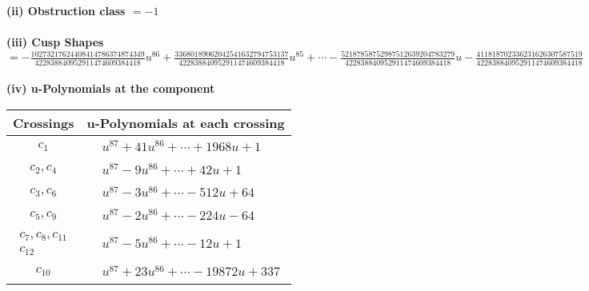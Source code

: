 \documentclass[1p]{elsarticle_modified}
\theoremstyle{definition}
\begin{document}
\flushleft \textbf{(ii) Obstruction class $= -1$}\\~\\
\flushleft \textbf{(iii) Cusp Shapes $= -\frac{10273217624408414786374874349}{422838840952911474609384418} u^{86}+\frac{33680189062042541632794753137}{422838840952911474609384418} u^{85}+\cdots-\frac{52187858752987512639204783279}{422838840952911474609384418} u-\frac{411818702336231626307587519}{422838840952911474609384418}$}\\~\\
\newpage\renewcommand{\arraystretch}{1}
\flushleft \textbf{(iv) u-Polynomials at the component}\newline \\
\begin{tabular}{m{50pt}|m{274pt}}
Crossings & \hspace{64pt}u-Polynomials at each crossing \\
\hline $$\begin{aligned}c_{1}\end{aligned}$$&$\begin{aligned}
&u^{87}+41 u^{86}+\cdots+1968 u+1
\end{aligned}$\\
\hline $$\begin{aligned}c_{2},c_{4}\end{aligned}$$&$\begin{aligned}
&u^{87}-9 u^{86}+\cdots+42 u+1
\end{aligned}$\\
\hline $$\begin{aligned}c_{3},c_{6}\end{aligned}$$&$\begin{aligned}
&u^{87}-3 u^{86}+\cdots-512 u+64
\end{aligned}$\\
\hline $$\begin{aligned}c_{5},c_{9}\end{aligned}$$&$\begin{aligned}
&u^{87}-2 u^{86}+\cdots-224 u-64
\end{aligned}$\\
\hline $$\begin{aligned}c_{7},c_{8},c_{11}\\c_{12}\end{aligned}$$&$\begin{aligned}
&u^{87}-5 u^{86}+\cdots-12 u+1
\end{aligned}$\\
\hline $$\begin{aligned}c_{10}\end{aligned}$$&$\begin{aligned}
&u^{87}+23 u^{86}+\cdots-19872 u+337
\end{aligned}$\\
\hline
\end{tabular}\\~\\
\end{document}

